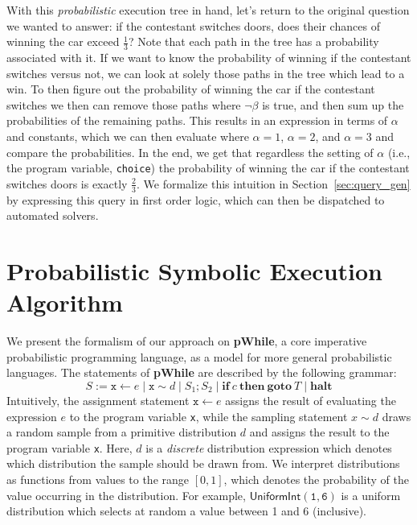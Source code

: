 \documentclass[acmsmall,review,anonymous]{acmart}\settopmatter{printfolios=true,printccs=false,printacmref=false}
\begin{document}
With this \textit{probabilistic} execution tree in hand, let's return to the original question we wanted to answer: if the contestant switches doors, does their chances of winning the car exceed $\frac{1}{3}$?
% 
Note that each path in the tree has a probability associated with it.
% 
If we want to know the probability of winning if the contestant switches versus not, we can look at solely those paths in the tree which lead to a win.
% 
To then figure out the probability of winning the car if the contestant switches we then can remove those paths where $\neg\beta$ is true, and then sum up the probabilities of the remaining paths.
% 
This results in an expression in terms of $\alpha$ and constants, which we can then evaluate where $\alpha = 1$, $\alpha = 2$, and $\alpha = 3$ and compare the probabilities.
% 
In the end, we get that regardless the setting of $\alpha$ (i.e., the program variable, \texttt{choice}) the probability of winning the car if the contestant switches doors is exactly $\frac{2}{3}$.
% 
We formalize this intuition in Section~\ref{sec:query_gen} by expressing this query in first order logic, which can then be dispatched to automated solvers.

\section{Probabilistic Symbolic Execution Algorithm}
\label{sec:pse}

We present the formalism of our approach on \textbf{pWhile}, a core imperative
probabilistic programming language, as a model for more general probabilistic
languages. The statements of \textbf{pWhile} are described by the following
grammar:
% 
\[
  S := \mathtt{x} \gets e \mid \mathtt{x} \sim d \mid S_1 ; S_2 \mid \mathbf{if}~c~\mathbf{then~goto}~T \mid \mathbf{halt} 
\]
% 
Intuitively, the assignment statement $\mathtt{x} \leftarrow e$ assigns the
result of evaluating the expression $e$ to the program variable \texttt{x},
while the sampling statement $x \sim d$ draws a random sample from a primitive
distribution $d$ and assigns the result to the program variable \texttt{x}.
% 
Here, $d$ is a \textit{discrete} distribution expression which denotes which distribution the sample should be drawn from.
% 
We interpret distributions as functions from values to the range $[0,1]$, which denotes the probability of the value occurring in the distribution.
% 
For example, $\mathsf{UniformInt}(\mathtt{1},\mathtt{6})$ is a uniform distribution which selects at random a value between 1 and $6$ (inclusive).
\end{document}
